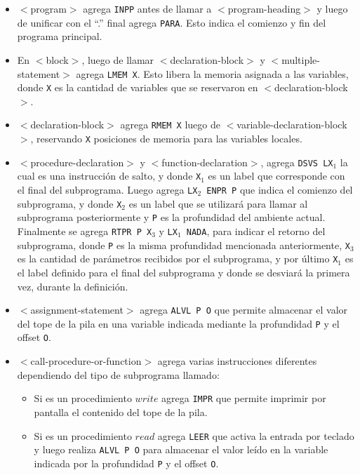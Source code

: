 \begin{itemize}
\item $<$program$>$ agrega \texttt{INPP} antes de llamar a $<$program-heading$>$  y luego de unificar con el ``.'' final agrega \texttt{PARA}. Esto indica el comienzo y fin del programa principal.
\item En $<$block$>$, luego de llamar $<$declaration-block$>$ y $<$multiple-statement$>$ agrega \texttt{LMEM X}. Esto libera la memoria asignada a las variables, donde \texttt{X} es la cantidad de variables que se reservaron en $<$declaration-block$>$.
\item $<$declaration-block$>$ agrega \texttt{RMEM X} luego de $<$variable-declaration-block$>$, reservando  \texttt{X} posiciones de memoria para las variables locales.
\item $<$procedure-declaration$>$ y $<$function-declaration$>$, agrega \texttt{DSVS LX$_{1}$} la cual es una instrucción de salto, y donde \texttt{X$_{1}$} es un label que corresponde con el final del subprograma. Luego agrega \texttt{LX$_{2}$ ENPR P} que indica el comienzo del subprograma, y donde \texttt{X$_{2}$} es un label que se utilizará para llamar al subprograma posteriormente y \texttt{P} es la profundidad del ambiente actual. Finalmente se agrega \texttt{RTPR P X$_{3}$} y \texttt{LX$_{1}$ NADA}, para indicar el retorno del subprograma, donde \texttt{P} es la misma profundidad mencionada anteriormente, \texttt{X$_{3}$} es la cantidad de parámetros recibidos por el subprograma, y por último \texttt{X$_{1}$} es el label definido para el final del subprograma y donde se desviará la primera vez, durante la definición.
\item $<$assignment-statement$>$ agrega \texttt{ALVL P O} que permite almacenar el valor del tope de la pila en una variable indicada mediante la profundidad \texttt{P} y el offset \texttt{O}.
\item  $<$call-procedure-or-function$>$ agrega varias instrucciones diferentes dependiendo del tipo de subprograma llamado:
\begin{itemize}
	\item Si es un procedimiento $write$ agrega \texttt{IMPR} que permite imprimir por pantalla el contenido del tope de la pila.
	\item Si es un procedimiento $read$ agrega \texttt{LEER} que activa la entrada por teclado y luego realiza \texttt{ALVL P O} para almacenar el valor leído en la variable indicada por la profundidad \texttt{P} y el offset \texttt{O}.

\end{itemize}
\end{itemize}
